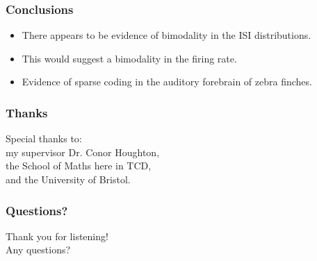 \documentclass{beamer}
\begin{document}
\begin{frame}
\frametitle{Conclusions}
\begin{itemize}
\item There appears to be evidence of bimodality in the ISI distributions.
\pause
\bigskip
\item This would suggest a bimodality in the firing rate.
\pause
\bigskip
\item Evidence of sparse coding in the auditory forebrain of zebra finches.
\end{itemize}
\end{frame}
\begin{frame}
\frametitle{Thanks}
Special thanks to: \\ \bigskip my supervisor Dr. Conor Houghton, \\ \pause \bigskip the School of Maths here in TCD,\\ \pause \bigskip and the University of Bristol.
\end{frame}
\begin{frame}
\frametitle{Questions?}
\begin{center}
Thank you for listening! \\ \bigskip Any questions?
\end{center}
\end{frame}
\end{document}
